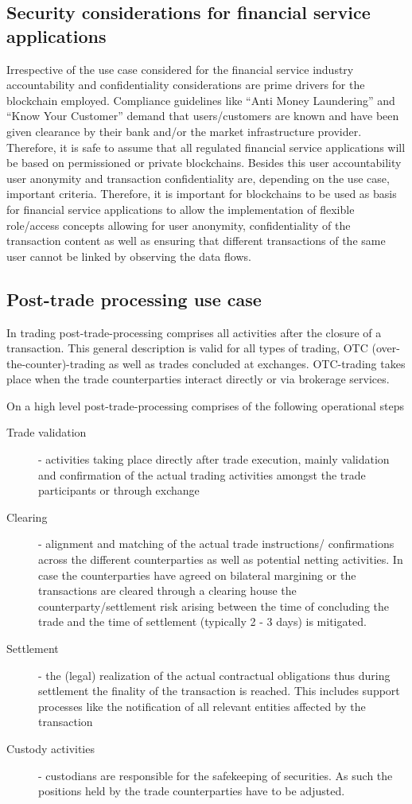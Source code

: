 \subsection{Security considerations for financial service applications}
Irrespective of the use case considered for the financial service industry accountability and confidentiality considerations are prime drivers for the blockchain employed. Compliance guidelines like “Anti Money Laundering” and “Know Your Customer” demand that users/customers are known and have been given clearance by their bank and/or the market infrastructure provider. Therefore, it is safe to assume that all regulated financial service applications will be based on permissioned or private blockchains. Besides this user accountability user anonymity and transaction confidentiality are, depending on the use case, important criteria. Therefore, it is important for blockchains to be used as basis for financial service applications to allow the implementation of flexible role/access concepts allowing for user anonymity, confidentiality of the transaction content as well as ensuring that different transactions of the same user cannot be linked by observing the data flows. 

\subsection{Post-trade processing use case}
In trading post-trade-processing comprises all activities after the closure of a transaction. This general description is valid for all types of trading, OTC (over-the-counter)-trading as well as trades concluded at exchanges. OTC-trading takes place when the trade counterparties interact directly or via brokerage services.

On a high level post-trade-processing comprises of the following operational steps
\begin{description}
\item [Trade validation] - activities taking place directly after trade execution, mainly validation and confirmation of the actual trading activities amongst the trade participants or through exchange 
\item [Clearing] - alignment and  matching of the actual trade instructions/ confirmations across the different counterparties as well as potential netting activities. In case the counterparties have agreed on bilateral margining or the transactions are cleared through a clearing house the counterparty/settlement risk arising between the time of concluding the trade and the time of settlement (typically 2 - 3 days) is mitigated. 
\item [Settlement] - the (legal) realization of the actual contractual obligations thus during settlement the finality of the transaction is reached. This includes support processes like the notification of all relevant entities affected by the transaction
\item [Custody activities] - custodians are responsible for the safekeeping of securities. As such the positions held by the trade counterparties have to be adjusted. 
\end{description}

